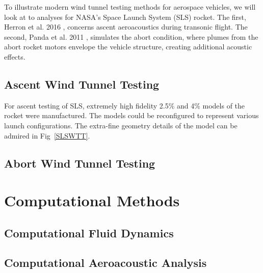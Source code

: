 \documentclass[]{aiaa-tc}%
\begin{document}
To illustrate modern wind tunnel testing methods for aerospace vehicles, we will look at to analyses for NASA's Space Launch System (SLS) rocket.  The first, Herron et al. 2016 \cite{SLSAscentWTT}, concerns ascent aeroacoustics during transonic flight.  The second, Panda et al. 2011 \cite{HeatedHeliumWTT}, simulates the abort condition, where plumes from the abort rocket motors envelope the vehicle structure, creating additional acoustic effects.

\subsection{Ascent Wind Tunnel Testing}

For ascent testing of SLS, extremely high fidelity 2.5\% and 4\% models of the rocket were manufactured.  The models could be reconfigured to represent various launch configurations.  The extra-fine geometry details of the model can be admired in Fig~\ref{SLSWTT}.

\subsection{Abort Wind Tunnel Testing}






\section{Computational Methods}


\subsection{Computational Fluid Dynamics}


\subsection{Computational Aeroacoustic Analysis}
\end{document}
